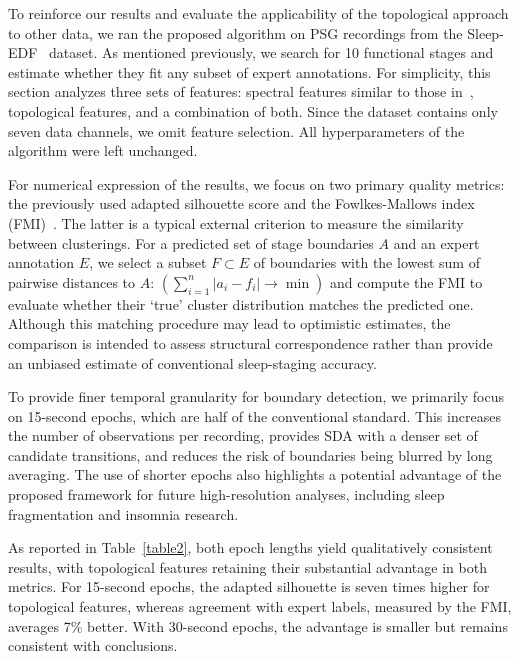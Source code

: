 \documentclass[pdflatex,sn-basic,Numbered]{sn-jnl}
\begin{document}
To reinforce our results and evaluate the applicability of the topological approach to other data, we ran the proposed algorithm on PSG recordings from the Sleep-EDF~\cite{SleepEdf,PhysioNet} dataset. As mentioned previously, we search for 10 functional stages and estimate whether they fit any subset of expert annotations. For simplicity, this section analyzes three sets of features: spectral features similar to those in~\cite{SDA}, topological features, and a combination of both. Since the dataset contains only seven data channels, we omit feature selection. All hyperparameters of the algorithm were left unchanged.

For numerical expression of the results, we focus on two primary quality metrics: the previously used adapted silhouette score and the Fowlkes-Mallows index (FMI)~\cite{Fowlkes01091983}. The latter is a typical external criterion to measure the similarity between clusterings. For a predicted set of stage boundaries $A$ and an expert annotation $E$, we select a subset $F \subset E$ of boundaries with the lowest sum of pairwise distances to $A$: $\left( \sum_{i = 1}^{n} |a_i - f_i| \rightarrow \min \right)$ and compute the FMI to evaluate whether their `true' cluster distribution matches the predicted one. Although this matching procedure may lead to optimistic estimates, the comparison is intended to assess structural correspondence rather than provide an unbiased estimate of conventional sleep-staging accuracy.

To provide finer temporal granularity for boundary detection, we primarily focus on 15-second epochs, which are half of the conventional standard. This increases the number of observations per recording, provides SDA with a denser set of candidate transitions, and reduces the risk of boundaries being blurred by long averaging. The use of shorter epochs also highlights a potential advantage of the proposed framework for future high-resolution analyses, including sleep fragmentation and insomnia research.

As reported in Table~\ref{table2}, both epoch lengths yield qualitatively consistent results, with topological features retaining their substantial advantage in both metrics. For 15-second epochs, the adapted silhouette is seven times higher for topological features, whereas agreement with expert labels, measured by the FMI, averages 7\% better. With 30-second epochs, the advantage is smaller but remains consistent with conclusions.
\end{document}
